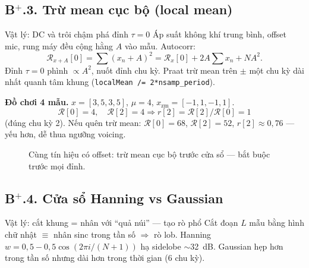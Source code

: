 \subsection*{B$^+$.3. Trừ mean cục bộ (local mean)}

\begin{firstprin}{Vật lý: DC và trôi chậm phá đỉnh $\tau=0$}
Áp suất không khí trung bình, offset mic, rung máy đều cộng hằng $A$ vào mẫu. Autocorr:
\[
\mathcal{R}_{x+A}[0]=\sum(x_n+A)^2=\mathcal{R}_x[0]+2A\sum x_n + NA^2.
\]
Đỉnh $\tau=0$ phình $\propto A^2$, nuốt đỉnh chu kỳ. Praat trừ mean trên $\pm$ một chu kỳ dài nhất quanh tâm khung (\texttt{localMean /= 2*nsamp\_period}).
\end{firstprin}

\noindent\textbf{Đồ chơi 4 mẫu.} $x=[3,5,3,5]$, $\mu=4$, $x_{\mathrm{zm}}=[-1,1,-1,1]$.
\[
\mathcal{R}[0]=4,\quad \mathcal{R}[2]=4 \Rightarrow r[2]=\mathcal{R}[2]/\mathcal{R}[0]=1
\]
(đúng chu kỳ 2). Nếu quên trừ mean: $\mathcal{R}[0]=68$, $\mathcal{R}[2]=52$, $r[2]\approx0{,}76$ --- yếu hơn, dễ thua ngưỡng voicing.

\begin{figure}[H]
\centering
{}
\caption{Cùng tín hiệu có offset: trừ mean cục bộ trước cửa sổ --- bắt buộc trước mọi đỉnh.}
\end{figure}

\subsection*{B$^+$.4. Cửa sổ Hanning vs Gaussian}

\begin{firstprin}{Vật lý: cắt khung = nhân với ``quả núi'' --- tạo rò phổ}
Cắt đoạn $L$ mẫu bằng hình chữ nhật $\equiv$ nhân sinc trong tần số $\Rightarrow$ rò lob. Hanning $w=0{,}5-0{,}5\cos(2\pi i/(N+1))$ hạ sidelobe $\sim$32~dB. Gaussian hẹp hơn trong tần số nhưng dài hơn trong thời gian (6 chu kỳ).
\end{firstprin}

